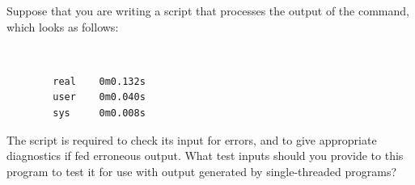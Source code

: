 \QuickQuiz{}
	Suppose that you are writing a script that processes the
	output of the  command, which looks as follows:

	\vspace{5pt}
	\begin{minipage}[t]{\columnwidth}
	\tt
	\scriptsize
	\begin{verbatim}
		real    0m0.132s
		user    0m0.040s
		sys     0m0.008s
	\end{verbatim}
	\end{minipage}
	\vspace{5pt}

	The script is required to check its input for errors, and to
	give appropriate diagnostics if fed erroneous  output.
	What test inputs should you provide to this program to test it
	for use with  output generated by single-threaded programs?
